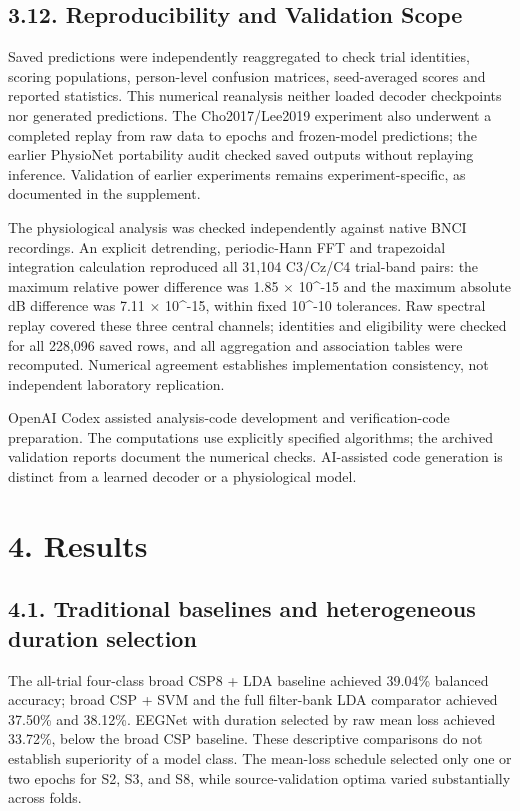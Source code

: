 \documentclass[11pt]{article}
\begin{document}
\subsection*{3.12. Reproducibility and Validation Scope}
Saved predictions were independently reaggregated to check trial identities, scoring populations, person-level confusion matrices, seed-averaged scores and reported statistics. This numerical reanalysis neither loaded decoder checkpoints nor generated predictions. The Cho2017/Lee2019 experiment also underwent a completed replay from raw data to epochs and frozen-model predictions; the earlier PhysioNet portability audit checked saved outputs without replaying inference. Validation of earlier experiments remains experiment-specific, as documented in the supplement.

The physiological analysis was checked independently against native BNCI recordings. An explicit detrending, periodic-Hann FFT and trapezoidal integration calculation reproduced all 31,104 C3/Cz/C4 trial-band pairs: the maximum relative power difference was 1.85 $\times$ 10\textasciicircum{}-15 and the maximum absolute dB difference was 7.11 $\times$ 10\textasciicircum{}-15, within fixed 10\textasciicircum{}-10 tolerances. Raw spectral replay covered these three central channels; identities and eligibility were checked for all 228,096 saved rows, and all aggregation and association tables were recomputed. Numerical agreement establishes implementation consistency, not independent laboratory replication.

OpenAI Codex assisted analysis-code development and verification-code preparation. The computations use explicitly specified algorithms; the archived validation reports document the numerical checks. AI-assisted code generation is distinct from a learned decoder or a physiological model.

\section*{4. Results}
\subsection*{4.1. Traditional baselines and heterogeneous duration selection}
The all-trial four-class broad CSP8 + LDA baseline achieved 39.04\% balanced accuracy; broad CSP + SVM and the full filter-bank LDA comparator achieved 37.50\% and 38.12\%. EEGNet with duration selected by raw mean loss achieved 33.72\%, below the broad CSP baseline. These descriptive comparisons do not establish superiority of a model class. The mean-loss schedule selected only one or two epochs for S2, S3, and S8, while source-validation optima varied substantially across folds.
\end{document}
